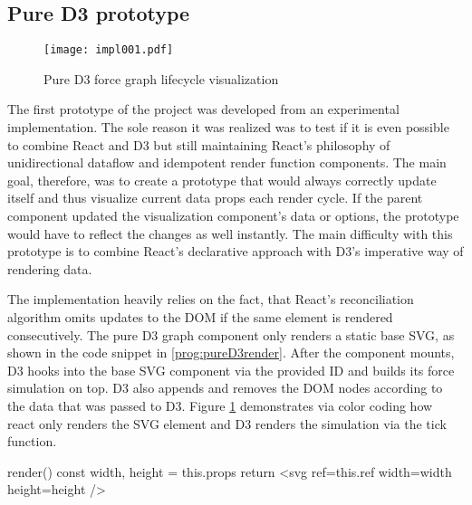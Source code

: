 

\subsection{Pure D3 prototype}

\begin{figure}
\centering
\texttt{[image: impl001.pdf]}
\caption{Pure D3 force graph lifecycle visualization}
\label{fig:pureD3Lifecycle}
\end{figure}

The first prototype of the project was developed from an experimental implementation. The sole reason it was realized was to test if it is even possible to combine React and D3 but still maintaining React's philosophy of unidirectional dataflow and idempotent render function components. The main goal, therefore, was to create a prototype that would always correctly update itself and thus visualize current data props each render cycle. If the parent component updated the visualization component's data or options, the prototype would have to reflect the changes as well instantly. The main difficulty with this prototype is to combine React's declarative approach with D3's imperative way of rendering data.

The implementation heavily relies on the fact, that React's reconciliation algorithm omits updates to the DOM if the same element is rendered consecutively. The pure D3 graph component only renders a static base SVG, as shown in the code snippet in \ref{prog:pureD3render}. After the component mounts, D3 hooks into the base SVG component via the provided ID and builds its force simulation on top. D3 also appends and removes the DOM nodes according to the data that was passed to D3. Figure \ref{fig:pureD3Lifecycle} demonstrates via color coding how react only renders the SVG element and D3 renders the simulation via the tick function.

\begin{program}
\caption{Render function of the pure D3 prototype}
\label{prog:pureD3render}
\begin{JsCode}
render() {
  const { width, height } = this.props
  return <svg ref={this.ref} width={width} height={height} />
}
\end{JsCode}
\end{program}

